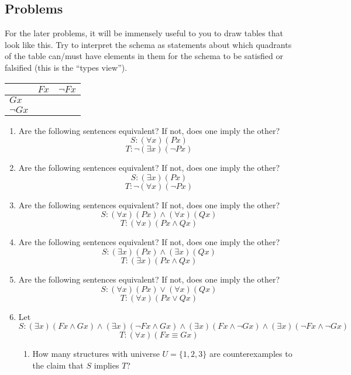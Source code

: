 \newpage
\begin{mdframed}[linewidth=1]
\section*{Problems}
For the later problems, it will be immensely useful to you to draw tables that look like this. Try to interpret the schema as statements about which quadrants of the table can/must have elements in them for the schema to be satisfied or falsified (this is the ``types view''). 

\begin{center}
\begin{tabular}{l|l|l}
 & $Fx$ & $\lnot Fx$ \\ \hline
$Gx$  &  &  \\ \hline
$\lnot Gx$ &  & 
\end{tabular}
\end{center}

\begin{enumerate}
    \item Are the following sentences equivalent? If not, does one imply the other?
    \[
        S: (\forall x)(Px)
    \]
    \[
        T: \lnot(\exists x)(\lnot Px)
    \]

    \item Are the following sentences equivalent? If not, does one imply the other?
    \[
        S: (\exists x)(Px)
    \]
    \[
        T: \lnot(\forall x)(\lnot Px)
    \]

    \item Are the following sentences equivalent? If not, does one imply the other?
    \[
        S: (\forall x)(Px) \land (\forall x)(Qx)
    \]
    \[
        T: (\forall x)(Px \land Qx)
    \]

    \item Are the following sentences equivalent? If not, does one imply the other?
    \[
        S: (\exists x) (Px) \land (\exists x)(Qx)
    \]
    \[
        T: (\exists x)(Px \land Qx)
    \]

    \item Are the following sentences equivalent? If not, does one imply the other?
    \[
        S: (\forall x)(Px) \vee (\forall x)(Qx)
    \]
    \[
        T: (\forall x)(Px \vee Qx)
    \]

    \item     Let
    \[
        S : (\exists x)(Fx \land Gx) \land (\exists x)(\lnot Fx \land Gx) \land (\exists x)(Fx \land \lnot Gx) \land (\exists x)(\lnot Fx \land \lnot Gx)
    \]
    \[
        T : (\forall x)(Fx \equiv Gx)
    \]
    \begin{enumerate}
        \item How many structures with universe $U = \{1, 2, 3\}$ are counterexamples to the claim that $S$ implies $T$?


\end{enumerate}
\end{enumerate}
\end{mdframed}
